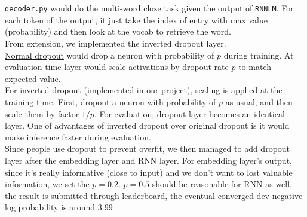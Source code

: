 \documentclass[11pt]{article}
\begin{document}
\part{}
\leavevmode
\newline
\indent \texttt{decoder.py} would do the multi-word cloze task given the output of \texttt{RNNLM}. For each token of the output, it just take the index of entry with max value (probability) and then look at the vocab to retrieve the word.\\
\indent From extension, we implemented the inverted dropout layer.\\
\indent \href{https://www.cs.toronto.edu/~hinton/absps/JMLRdropout.pdf}{Normal dropout} would drop a neuron with probability of $p$ during training. At evaluation time layer would scale activations by dropout rate $p$ to match expected value.\\
\indent For inverted dropout (implemented in our project), scaling is applied at the training time. First, dropout a neuron with probability of $p$ as usual, and then scale them by factor $1/p$. For evaluation, dropout layer becomes an identical layer. One of advantages of inverted dropout over original dropout is it would make inference faster during evaluation.\\
\indent Since people use dropout to prevent overfit, we then managed to add dropout layer after the embedding layer and RNN layer. For embedding layer's output, since it's really informative (close to input) and we don't want to lost valuable information, we set the $p = 0.2$. $p =  0.5$ should be reasonable for RNN as well.\\
\indent the result is submitted through leaderboard, the eventual converged dev negative log probability is around 3.99
\end{document}
